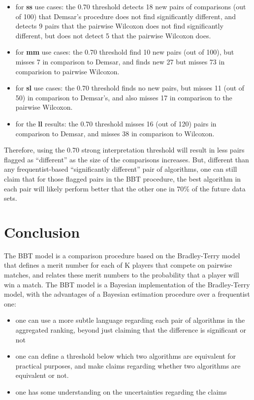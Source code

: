 \documentclass[twoside,11pt,preprint]{article}
\def\tightlist{}
\begin{document}
\begin{itemize}
\item
  for \textbf{ss} use cases: the 0.70 threshold detects 18 new pairs of
  comparisons (out of 100) that Demsar's procedure does not find
  significantly different, and detects 9 pairs that the pairwise
  Wilcoxon does not find significantly different, but does not detect
  5 that the pairwise Wilcoxon does.
\item
  for \textbf{mm} use cases: the 0.70 threshold find 10 new pairs (out of
  100), but misses 7 in comparison to Demsar, and finds new 27 but
  misses 73 in comparision to pairwise Wilcoxon.
\item
  for \textbf{sl} use cases: the 0.70 threshold finds no new pairs, but
  misses 11 (out of 50) in comparison to Demsar's, and also misses 17
  in comparison to the pairwise Wilcoxon.
\item
  for the \textbf{ll} results: the 0.70 threshold misses 16 (out of 120)
  pairs in comparison to Demsar, and misses 38 in comparison to
  Wilcoxon.
\end{itemize}

Therefore, using the 0.70 strong interpretation threshold will result
in less pairs flagged as ``different'' as the size of the comparisons
increases. But, different than any frequentist-based ``significantly
different'' pair of algorithms, one can still claim that for those
flagged pairs in the BBT procedure, the best algorithm in each pair
will likely perform better that the other one in 70\% of the future
data sets.

\hypertarget{conclusion}{%
\section{\texorpdfstring{Conclusion \label{sec:conc}}{Conclusion }}\label{conclusion}}

The BBT model is a comparison procedure based on the Bradley-Terry
model that defines a merit number for each of K players that compete
on pairwise matches, and relates these merit numbers to the
probability that a player will win a match. The BBT model is a
Bayesian implementation of the Bradley-Terry model, with the
advantages of a Bayesian estimation procedure over a frequentist one:

\begin{itemize}
\tightlist
\item
  one can use a more subtle language regarding each pair of algorithms
  in the aggregated ranking, beyond just claiming that the difference
  is significant or not
\item
  one can define a threshold below which two algorithms are equivalent
  for practical purposes, and make claims regarding whether two
  algorithms are equivalent or not.
\item
  one has some understanding on the uncertainties regarding the claims
\end{itemize}
\end{document}
